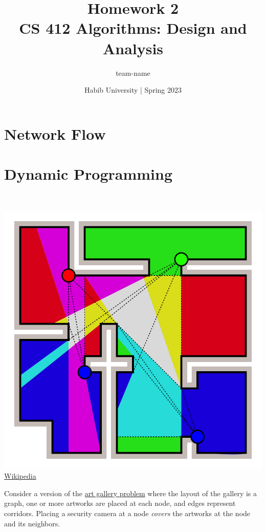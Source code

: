 \documentclass[addpoints,a4paper]{exam}
\title{Homework 2\\ CS 412 Algorithms: Design and Analysis}
\author{team-name}  %
\date{Habib University | Spring 2023}
\begin{document}
\maketitle

\begin{questions}


  \section*{Network Flow}
  
  \section*{Dynamic Programming}
\question \ \newline
  \begin{minipage}{0.2\linewidth}
    \centering
    \includegraphics[width=\textwidth,align=t]{gallery}\\
    \href{https://en.wikipedia.org/wiki/Art_gallery_problem}{Wikipedia}
  \end{minipage}
  \hfill
  \begin{minipage}{0.78\linewidth}
    Consider a version of the \href{https://en.wikipedia.org/wiki/Art_gallery_problem}{art gallery problem} where the layout of the gallery is a graph, one or more artworks are placed at each node, and edges represent corridors. Placing a security camera at a node \textit{covers} the artworks at the node and its neighbors.
    \begin{parts}

\end{parts}
\end{minipage}
\end{questions}
\end{document}
